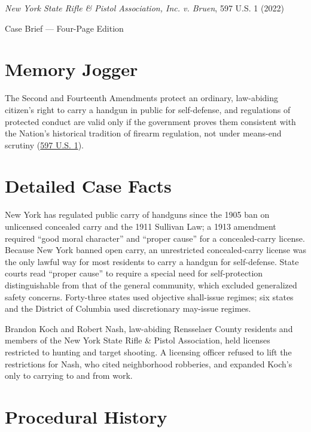 \documentclass[12pt]{article}
\begin{document}
\begin{center}
{\LARGE \textit{New York State Rifle \& Pistol Association, Inc. v. Bruen}, 597 U.S. 1 (2022)\par}
\vspace{0.8em}
{\large Case Brief --- Four-Page Edition\par}
\end{center}
\vspace{1em}

\section{Memory Jogger}

The Second and Fourteenth Amendments protect an ordinary, law-abiding citizen's right to carry a handgun in public for self-defense, and regulations of protected conduct are valid only if the government proves them consistent with the Nation's historical tradition of firearm regulation, not under means-end scrutiny (\href{https://www.law.cornell.edu/supremecourt/text/20-843}{597 U.S. 1}).

\section{Detailed Case Facts}

New York has regulated public carry of handguns since the 1905 ban on unlicensed concealed carry and the 1911 Sullivan Law; a 1913 amendment required ``good moral character'' and ``proper cause'' for a concealed-carry license. Because New York banned open carry, an unrestricted concealed-carry license was the only lawful way for most residents to carry a handgun for self-defense. State courts read ``proper cause'' to require a special need for self-protection distinguishable from that of the general community, which excluded generalized safety concerns. Forty-three states used objective shall-issue regimes; six states and the District of Columbia used discretionary may-issue regimes.

Brandon Koch and Robert Nash, law-abiding Rensselaer County residents and members of the New York State Rifle \& Pistol Association, held licenses restricted to hunting and target shooting. A licensing officer refused to lift the restrictions for Nash, who cited neighborhood robberies, and expanded Koch's only to carrying to and from work.

\section{Procedural History}
\end{document}
